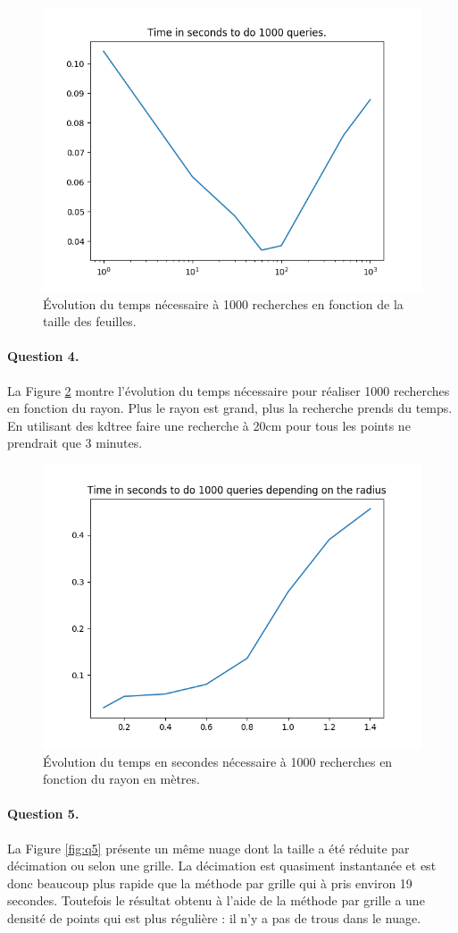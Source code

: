 \documentclass[french]{article}
\begin{document}
\begin{figure}[h]
	\centering
	\includegraphics[width=0.6\linewidth]{kdt_lfsize.png}
	\caption{Évolution du temps nécessaire à 1000 recherches en fonction de la taille des feuilles.}
	\label{fig:leafsize}
\end{figure}

\paragraph{Question 4.}
La Figure \ref{fig:radius} montre l'évolution du temps nécessaire pour réaliser 1000 recherches en fonction du rayon. Plus le rayon est grand, plus la recherche prends du temps. En utilisant des kdtree faire une recherche à 20cm pour tous les points ne prendrait que 3 minutes.


\begin{figure}[h]
	\centering
	\includegraphics[width=0.6\linewidth]{kdt_radius.png}
	\caption{Évolution du temps en secondes nécessaire à 1000 recherches en fonction du rayon en mètres.}
	\label{fig:radius}
\end{figure}

\paragraph{Question 5.}
La Figure \ref{fig:q5} présente un même nuage dont la taille a été réduite par décimation ou selon une grille. La décimation est quasiment instantanée et est donc beaucoup plus rapide que la méthode par grille qui à pris environ 19 secondes. Toutefois le résultat obtenu à l'aide de la méthode par grille a une densité de points qui est plus régulière : il n'y a pas de trous dans le nuage.
\end{document}
